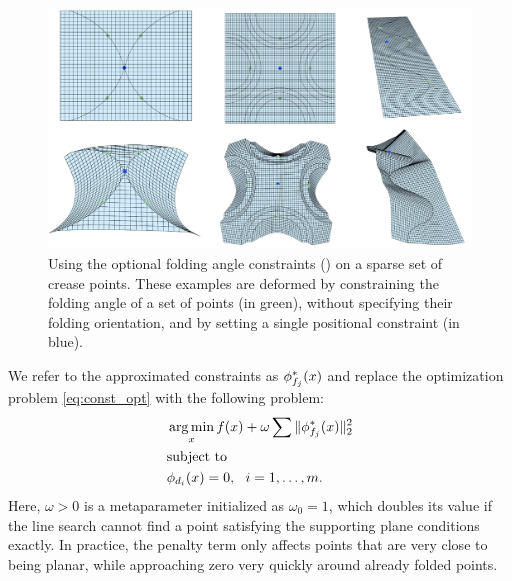 \begin{figure} [h]
	\centering
	\includegraphics[width=\linewidth]{figures/dihedral_editing}
	\caption{Using the optional folding angle constraints () on a sparse set of crease points. These examples are deformed by constraining the folding angle of a set of points (in green), without specifying their folding orientation, and by setting a single positional constraint (in blue).}
	\label{fig:dihedral_editing}
\end{figure}

We refer to the approximated constraints as $\phi^*_{f_j}(x)$ and replace the optimization problem \eqref{eq:const_opt} with the following problem:
\begin{equation} \label{eq:const_opt_penalty}
\begin{aligned}
& \operatorname*{arg\,min}_x f(x) + \omega \sum \|\phi^*_{f_j}(x)\|_2^2 \\
& \textrm{subject to} \\
& \phi_{d_i}(x) = 0, \ \  i = 1, \ldots, m. \\ 
\end{aligned}
\end{equation}
Here, $\omega > 0$ is a metaparameter initialized as $\omega_0 = 1$, which doubles its value if the line search cannot find a point satisfying the supporting plane conditions exactly. In practice, the penalty term only affects points that are very close to being planar, while approaching zero very quickly around already folded points.

